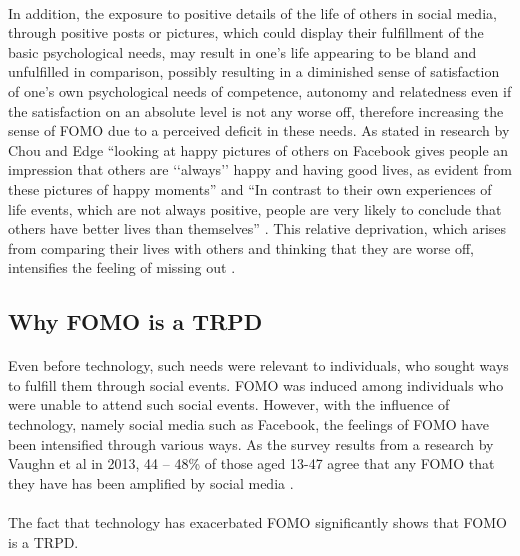     \paragraph{}
      In addition, the exposure to positive details of the life of others in social media, through positive posts or pictures, which could display their fulfillment of the basic psychological needs, may result in one’s life appearing to be bland and unfulfilled in comparison, possibly resulting in a diminished sense of satisfaction of one’s own psychological needs of competence, autonomy and relatedness even if the satisfaction on an absolute level is not any worse off, therefore increasing the sense of FOMO due to a perceived deficit in these needs. As stated in research by Chou and Edge “looking at happy pictures of others on Facebook gives people an impression that others are ‘‘always’’ happy and having good lives, as evident from these pictures of happy moments” and “In contrast to their own experiences of life events, which are not always positive, people are very likely to conclude that others have better lives than themselves” \cite{chou2012they}. This relative deprivation, which arises from comparing their lives with others and thinking that they are worse off, intensifies the feeling of missing out \cite{Vaughn2012Fear}.
  \subsection{Why FOMO is a TRPD}
    \paragraph{}
      Even before technology, such needs were relevant to individuals, who sought ways to fulfill them through social events. FOMO was induced among individuals who were unable to attend such social events. However, with the influence of technology, namely social media such as Facebook, the feelings of FOMO have been intensified through various ways. As the survey results from a research by Vaughn et al in 2013, 44 – 48\% of those aged 13-47 agree that any FOMO that they have has been amplified by social media \cite{Vaughn2012Fear}.
    \paragraph{}
      The fact that technology has exacerbated FOMO significantly shows that FOMO is a TRPD.
      